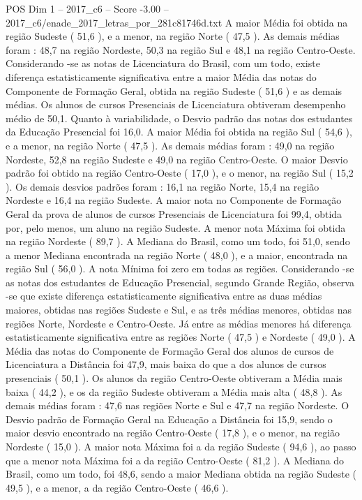 \begin{textsample}{POS Dim 1 – 2017\_c6 – Score -3.00 – 2017\_c6/enade\_2017\_letras\_por\_281c81746d.txt}
A maior Média foi obtida na região Sudeste ( 51,6 ), e a menor, na região Norte ( 47,5 ).
As demais médias foram : 48,7 na região Nordeste, 50,3 na região Sul e 48,1 na região Centro-Oeste.
Considerando -se as notas de Licenciatura do Brasil, com um todo, existe diferença estatisticamente significativa entre a maior Média das notas do Componente de Formação Geral, obtida na região Sudeste ( 51,6 ) e as demais médias.
Os alunos de cursos Presenciais de Licenciatura obtiveram desempenho médio de 50,1.
Quanto à variabilidade, o Desvio padrão das notas dos estudantes da Educação Presencial foi 16,0.
A maior Média foi obtida na região Sul ( 54,6 ), e a menor, na região Norte ( 47,5 ).
As demais médias foram : 49,0 na região Nordeste, 52,8 na região Sudeste e 49,0 na região Centro-Oeste.
O maior Desvio padrão foi obtido na região Centro-Oeste ( 17,0 ), e o menor, na região Sul ( 15,2 ).
Os demais desvios padrões foram : 16,1 na região Norte, 15,4 na região Nordeste e 16,4 na região Sudeste.
A maior nota no Componente de Formação Geral da prova de alunos de cursos Presenciais de Licenciatura foi 99,4, obtida por, pelo menos, um aluno na região Sudeste.
A menor nota Máxima foi obtida na região Nordeste ( 89,7 ).
A Mediana do Brasil, como um todo, foi 51,0, sendo a menor Mediana encontrada na região Norte ( 48,0 ), e a maior, encontrada na região Sul ( 56,0 ).
A nota Mínima foi zero em todas as regiões.
Considerando -se as notas dos estudantes de Educação Presencial, segundo Grande Região, observa -se que existe diferença estatisticamente significativa entre as duas médias maiores, obtidas nas regiões Sudeste e Sul, e as três médias menores, obtidas nas regiões Norte, Nordeste e Centro-Oeste.
Já entre as médias menores há diferença estatisticamente significativa entre as regiões Norte ( 47,5 ) e Nordeste ( 49,0 ).
A Média das notas do Componente de Formação Geral dos alunos de cursos de Licenciatura a Distância foi 47,9, mais baixa do que a dos alunos de cursos presenciais ( 50,1 ).
Os alunos da região Centro-Oeste obtiveram a Média mais baixa ( 44,2 ), e os da região Sudeste obtiveram a Média mais alta ( 48,8 ).
As demais médias foram : 47,6 nas regiões Norte e Sul e 47,7 na região Nordeste.
O Desvio padrão de Formação Geral na Educação a Distância foi 15,9, sendo o maior desvio encontrado na região Centro-Oeste ( 17,8 ), e o menor, na região Nordeste ( 15,0 ).
A maior nota Máxima foi a da região Sudeste ( 94,6 ), ao passo que a menor nota Máxima foi a da região Centro-Oeste ( 81,2 ).
A Mediana do Brasil, como um todo, foi 48,6, sendo a maior Mediana obtida na região Sudeste ( 49,5 ), e a menor, a da região Centro-Oeste ( 46,6 ).

\end{textsample}
